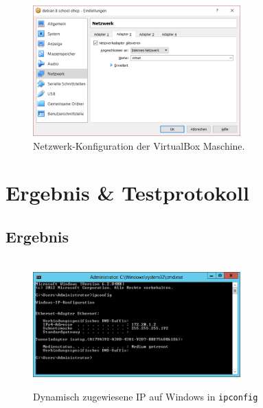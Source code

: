 \documentclass[12pt,a4paper,twoside,titlepage]{article}
\begin{document}
		\begin{figure}
			\hrulefill\\
			\center
			
			\includegraphics[width=8cm]{vbox_network_config}
			\caption{\label{vboxconfig} Netzwerk-Konfiguration der VirtualBox Maschine.}
			\hrulefill
		\end{figure}

		\section{Ergebnis \& Testprotokoll}
		
		\subsection{Ergebnis}
		
        \begin{figure}
          \hrulefill\\
          \center
          \includegraphics[width=8cm]{cmd_ipconfig_dynamic_ip}
          \caption{\label{dynip} Dynamisch zugewiesene IP auf Windows in \texttt{ipconfig}}
          \hrulefill
        \end{figure}
\end{document}

